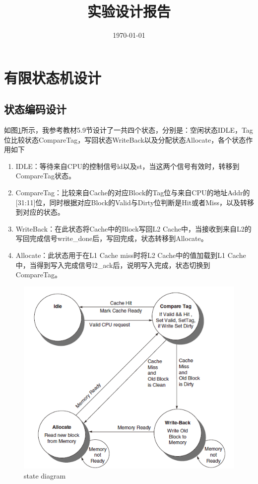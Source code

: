 \documentclass{../source/zjureport}
\title{实验设计报告}
\date{\today}
\begin{document}
    \makecover
    \tableofcontents
    \newpage
    \section{有限状态机设计}
        \subsection{状态编码设计}
            如图\ref{state diagram}所示，我参考教材5.9节设计了一共四个状态，分别是：空闲状态IDLE，Tag位比较状态CompareTag，写回状态WriteBack以及分配状态Allocate，各个状态作用如下
            \begin{enumerate}
                \item IDLE：等待来自CPU的控制信号ld以及st，当这两个信号有效时，转移到CompareTag状态。
                \item CompareTag：比较来自Cache的对应Block的Tag位与来自CPU的地址Addr的[31:11]位，同时根据对应Block的Valid与Dirty位判断是Hit或者Miss，以及转移到对应的状态。
                \item WriteBack：在此状态将Cache中的Block写回L2 Cache中，当接收到来自L2的写回完成信号write_done后，写回完成，状态转移到Allocate。
                \item Allocate：此状态用于在L1 Cache miss时将L2 Cache中的值加载到L1 Cache中，当得到写入完成信号l2_ack后，说明写入完成，状态切换到CompareTag。
            \end{enumerate}

            \begin{figure}[H]
                \centering
                \includegraphics[]{figure/fourState.png}
                \caption{state diagram}
                \label{state diagram}
            \end{figure}
\end{document}
